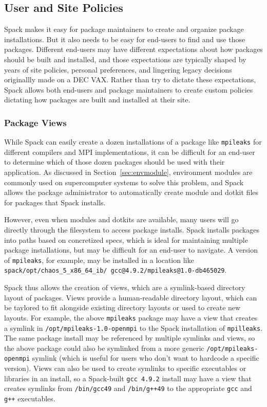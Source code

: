 
\subsection{User and Site Policies}
\label{sec:usecase-policy}

Spack makes it easy for package maintainers to create and organize package installations.
But it also needs to be easy for end-users to find and use those packages.
Different end-users may have different expectations about how packages should be built and installed,
and those expectations are typically shaped by years of site policies, personal preferences,
and lingering legacy decisions originallly made on a DEC VAX.
Rather than try to dictate these expectations,
Spack allows both end-users and package maintainers to create custom policies dictating
how packages are built and installed at their site.

\subsubsection{Package Views}
\label{sec:package-views}

While Spack can easily create a dozen installations of a package like {\tt mpileaks}
for different compilers and MPI implementations,
it can be difficult for an end-user to determine which of those dozen packages should be used with their application.
As discussed in Section~\ref{sec:envmodule},
environment modules are commonly used on supercomputer systems to solve this problem,
and Spack allows the package administrator to automatically create module and dotkit files for packages that Spack installs.

However, even when modules and dotkits are available,
many users will go directly through the filesystem to access package installs.
Spack installs packages into paths based on concretized specs,
which is ideal for maintaining multiple package installations, but may be difficult for an end-user to navigate.
A version of {\tt mpileaks}, for example, may be installed in a location like
{\tt spack/opt/chaos\_5\_x86\_64\_ib/ gcc@4.9.2/mpileaks@1.0-db465029}.

Spack thus allows the creation of views, which are a symlink-based directory layout of packages.
Views provide a human-readable directory layout,
which can be taylored to fit alongside existing directory layouts or used to create new layouts.
For example, the above {\tt mpileaks} package may have a view that creates a symlink in
{\tt /opt/mpileaks-1.0-openmpi} to the Spack installation of {\tt mpilleaks}.
The same package install may be referenced by multiple symlinks and views,
so the above package could also be symlinked from a more generic {\tt /opt/mpileaks-openmpi}
symlink (which is useful for users who don't want to hardcode a specific version).
Views can also be used to create symlinks to specific executables or libraries in an install,
so a Spack-built {\tt gcc 4.9.2} install may have a view that creates symlinks from
{\tt /bin/gcc49} and {\tt /bin/g++49} to the appropriate {\tt gcc} and {\tt g++} executables.

